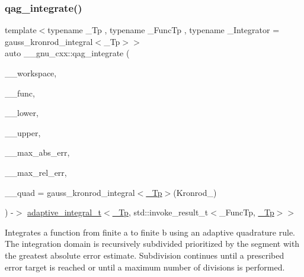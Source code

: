 \subsubsection{\texorpdfstring{qag\+\_\+integrate()}{qag\_integrate()}}
{\footnotesize\ttfamily template$<$typename \+\_\+\+Tp , typename \+\_\+\+Func\+Tp , typename \+\_\+\+Integrator  = gauss\+\_\+kronrod\+\_\+integral$<$\+\_\+\+Tp$>$$>$ \\
auto \+\_\+\+\_\+gnu\+\_\+cxx\+::qag\+\_\+integrate (\begin{DoxyParamCaption}\item[{\hyperlink{class____gnu__cxx_1_1integration__workspace}{integration\+\_\+workspace}$<$ \hyperlink{namespace____gnu__cxx_a3b19a9c800ca194374ef9172290f7d79}{\+\_\+\+Tp}, std\+::invoke\+\_\+result\+\_\+t$<$ \+\_\+\+Func\+Tp, \hyperlink{namespace____gnu__cxx_a3b19a9c800ca194374ef9172290f7d79}{\+\_\+\+Tp} $>$$>$ \&}]{\+\_\+\+\_\+workspace,  }\item[{\+\_\+\+Func\+Tp}]{\+\_\+\+\_\+func,  }\item[{\hyperlink{namespace____gnu__cxx_a3b19a9c800ca194374ef9172290f7d79}{\+\_\+\+Tp}}]{\+\_\+\+\_\+lower,  }\item[{\hyperlink{namespace____gnu__cxx_a3b19a9c800ca194374ef9172290f7d79}{\+\_\+\+Tp}}]{\+\_\+\+\_\+upper,  }\item[{\hyperlink{namespace____gnu__cxx_a3b19a9c800ca194374ef9172290f7d79}{\+\_\+\+Tp}}]{\+\_\+\+\_\+max\+\_\+abs\+\_\+err,  }\item[{\hyperlink{namespace____gnu__cxx_a3b19a9c800ca194374ef9172290f7d79}{\+\_\+\+Tp}}]{\+\_\+\+\_\+max\+\_\+rel\+\_\+err,  }\item[{\+\_\+\+Integrator}]{\+\_\+\+\_\+quad = {\ttfamily gauss\+\_\+kronrod\+\_\+integral$<$\hyperlink{namespace____gnu__cxx_a3b19a9c800ca194374ef9172290f7d79}{\+\_\+\+Tp}$>$(Kronrod\+\_)} }\end{DoxyParamCaption}) -\/$>$ \hyperlink{struct____gnu__cxx_1_1adaptive__integral__t}{adaptive\+\_\+integral\+\_\+t}$<$\hyperlink{namespace____gnu__cxx_a3b19a9c800ca194374ef9172290f7d79}{\+\_\+\+Tp}, std\+::invoke\+\_\+result\+\_\+t$<$\+\_\+\+Func\+Tp, \hyperlink{namespace____gnu__cxx_a3b19a9c800ca194374ef9172290f7d79}{\+\_\+\+Tp}$>$$>$
    }

Integrates a function from finite a to finite b using an adaptive quadrature rule. The integration domain is recursively subdivided prioritized by the segment with the greatest absolute error estimate. Subdivision continues until a prescribed error target is reached or until a maximum number of divisions is performed.

